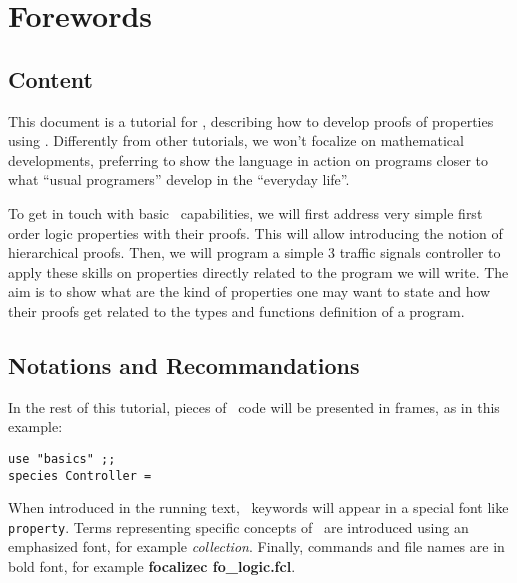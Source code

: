 \section{Forewords}

\subsection{Content}
This document is a tutorial for \focal, describing how to
develop proofs of properties using \zenon. Differently from other
tutorials, we won't focalize on mathematical developments, preferring
to show the language in action on programs closer to what ``usual
programers'' develop in the ``everyday life''.

To get in touch with basic \zenon\ capabilities, we will first address
very simple first order logic properties with their proofs. This will
allow introducing the notion of hierarchical proofs. Then, we will
program a simple 3 traffic signals controller to apply these skills on
properties directly related to the program we will write. The aim is to
show what are the kind of properties one may want to state and how
their proofs get related to the types and functions definition of a
program.

\subsection{Notations and Recommandations}
In the rest of this tutorial, pieces of \focal\ code will be presented in
frames, as in this example:

{\scriptsize
\begin{lstlisting}
use "basics" ;;
species Controller =
\end{lstlisting}}

When introduced in the running text, \focal\ keywords will appear in a
special font like \lstinline"property". Terms representing specific
concepts of \focal\ are introduced using an emphasized font, for
example \emph{collection}. Finally, commands and file names are in
bold font, for example \textbf{focalizec fo\_logic.fcl}.
